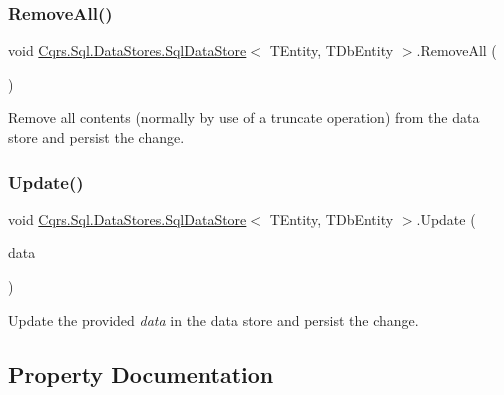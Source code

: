 \subsubsection{\texorpdfstring{Remove\+All()}{RemoveAll()}}
{\footnotesize\ttfamily void \hyperlink{classCqrs_1_1Sql_1_1DataStores_1_1SqlDataStore}{Cqrs.\+Sql.\+Data\+Stores.\+Sql\+Data\+Store}$<$ T\+Entity, T\+Db\+Entity $>$.Remove\+All (\begin{DoxyParamCaption}{ }\end{DoxyParamCaption})}



Remove all contents (normally by use of a truncate operation) from the data store and persist the change. 

\mbox{\label{classCqrs_1_1Sql_1_1DataStores_1_1SqlDataStore_a5cc26a4d03036f93b5942ff2e04afd2d_a5cc26a4d03036f93b5942ff2e04afd2d}} 
\subsubsection{\texorpdfstring{Update()}{Update()}}
{\footnotesize\ttfamily void \hyperlink{classCqrs_1_1Sql_1_1DataStores_1_1SqlDataStore}{Cqrs.\+Sql.\+Data\+Stores.\+Sql\+Data\+Store}$<$ T\+Entity, T\+Db\+Entity $>$.Update (\begin{DoxyParamCaption}\item[{T\+Entity}]{data }\end{DoxyParamCaption})}



Update the provided {\itshape data}  in the data store and persist the change. 



\subsection{Property Documentation}
\mbox{\label{classCqrs_1_1Sql_1_1DataStores_1_1SqlDataStore_a60de9af52248c2d71e2bb010e51b5c06_a60de9af52248c2d71e2bb010e51b5c06}} 
